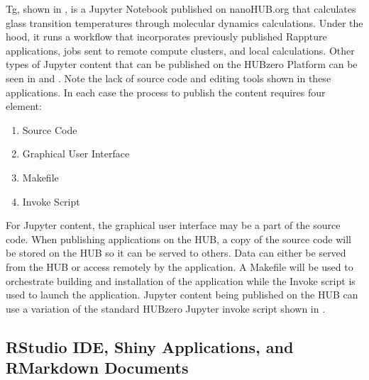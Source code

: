 \documentclass[conference]{../sty/IEEEtran}
\begin{document}
Tg, shown in , is a Jupyter Notebook published on nanoHUB.org that
calculates glass transition temperatures through molecular dynamics
calculations. Under the hood, it runs a workflow that incorporates previously
published Rappture applications, jobs sent to remote compute clusters, and
local calculations. Other types of Jupyter content that can be published on the
HUBzero Platform can be seen in  and . Note
the lack of source code and editing tools shown in these applications. In each
case the process to publish the content requires four element:

\begin{enumerate}
\item Source Code
\item Graphical User Interface
\item Makefile
\item Invoke Script
\end{enumerate}



For Jupyter content, the graphical user interface may be a part of the source
code. When publishing applications on the HUB, a copy of the source code will
be stored on the HUB so it can be served to others. Data can either be served
from the HUB or access remotely by the application. A Makefile will be used to
orchestrate building and installation of the application while the Invoke
script is used to launch the application. Jupyter content being published on
the HUB can use a variation of the standard HUBzero Jupyter invoke script shown
in .




\subsection {RStudio IDE, Shiny Applications, and RMarkdown Documents}
\end{document}
